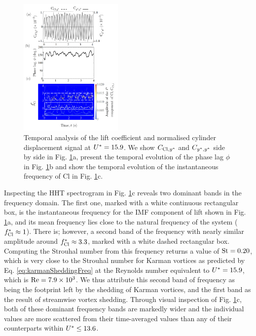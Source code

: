 \documentclass[oneside]{utmthesis}
\begin{document}
\begin{figure}
  \centering
  \includegraphics[width=0.45\textwidth]{figs/tempAnalysisTransition}
  \caption{Temporal analysis of the lift coefficient and normalised cylinder displacement signal at $U^{*} = 15.9$. We show $C_{\text{Cl},y^{*}}$ and $C_{y^{*},y^{*}}$ side by side in Fig. \ref{fig:tempAnalysisTransition}a, present the temporal evolution of the phase lag $\phi$ in Fig. \ref{fig:tempAnalysisTransition}b and show the temporal evolution of the instantaneous frequency of Cl in Fig. \ref{fig:tempAnalysisTransition}c.}
  \label{fig:tempAnalysisTransition}
\end{figure}

Inspecting the HHT spectrogram in Fig. \ref{fig:tempAnalysisTransition}c reveals two dominant bands in the frequency domain. The first one, marked with a white continuous rectangular box, is the instantaneous frequency for the IMF component of lift shown in Fig. \ref{fig:tempAnalysisTransition}a, and its mean frequency lies close to the natural frequency of the system ($f_{\text{Cl}}^{*} \approx 1$). There is; however, a second band of the frequency with nearly similar amplitude around $f_{\text{Cl}}^{*} \approx 3.3$, marked with a white dashed rectangular box. Computing the Strouhal number from this frequency returns a value of $\text{St} = 0.20$, which is very close to the Strouhal number for Karman vortices as predicted by Eq. \ref{eq:karmanSheddingFreq} at the Reynolds number equivalent to $U^{*} = 15.9$, which is $\text{Re} = 7.9 \times 10^{3}$. We thus attribute this second band of frequency as being the footprint left by the shedding of Karman vortices, and the first band as the result of streamwise vortex shedding. Through visual inspection of Fig. \ref{fig:tempAnalysisTransition}c, both of these dominant frequency bands are markedly wider and the individual values are more scattered from their time-averaged values than any of their counterparts within $U^{*} \leq 13.6$.
\end{document}

